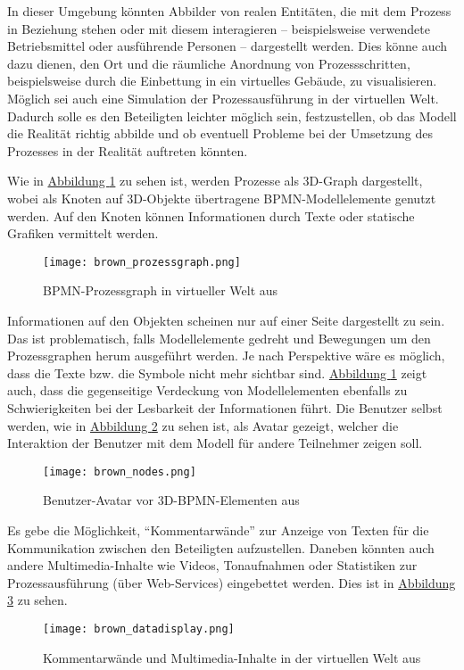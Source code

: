 \documentclass[a4paper,10pt]{sphinxmanual}
\begin{document}
In dieser Umgebung könnten Abbilder von realen Entitäten, die mit dem Prozess in Beziehung stehen oder mit diesem interagieren – beispielsweise verwendete Betriebsmittel oder ausführende Personen – dargestellt werden.
Dies könne auch dazu dienen, den Ort und die räumliche Anordnung von Prozessschritten, beispielsweise durch die Einbettung in ein virtuelles Gebäude, zu visualisieren.
Möglich sei auch eine Simulation der Prozessausführung in der virtuellen Welt.
Dadurch solle es den Beteiligten leichter möglich sein, festzustellen, ob das Modell die Realität richtig abbilde und ob eventuell Probleme bei der Umsetzung des Prozesses in der Realität auftreten könnten.

Wie in \hyperref[related:brown-process]{Abbildung  \ref*{related:brown-process}} zu sehen ist, werden Prozesse als 3D-Graph dargestellt, wobei als Knoten auf 3D-Objekte übertragene BPMN-Modellelemente genutzt werden.
Auf den Knoten können Informationen durch Texte oder statische Grafiken vermittelt werden.
\begin{figure}[htbp]
\centering
\capstart

\texttt{[image: brown\_prozessgraph.png]}
\caption{BPMN-Prozessgraph in virtueller Welt aus \cite{brown_conceptual_2010}}\label{related:brown-process}\end{figure}

Informationen auf den Objekten scheinen nur auf einer Seite dargestellt zu sein. Das ist problematisch, falls Modellelemente gedreht und Bewegungen um den Prozessgraphen herum ausgeführt werden.
Je nach Perspektive wäre es möglich, dass die Texte bzw. die Symbole nicht mehr sichtbar sind.
\hyperref[related:brown-process]{Abbildung  \ref*{related:brown-process}} zeigt auch, dass die gegenseitige Verdeckung von Modellelementen ebenfalls zu Schwierigkeiten bei der Lesbarkeit der Informationen führt.
Die Benutzer selbst werden, wie in \hyperref[related:brown-nodes]{Abbildung  \ref*{related:brown-nodes}} zu sehen ist, als Avatar gezeigt, welcher die Interaktion der Benutzer mit dem Modell für andere Teilnehmer zeigen soll.
\begin{figure}[htbp]
\centering
\capstart

\texttt{[image: brown\_nodes.png]}
\caption{Benutzer-Avatar vor 3D-BPMN-Elementen aus \cite{brown_conceptual_2010}}\label{related:brown-nodes}\end{figure}

Es gebe die Möglichkeit, "`Kommentarwände"' zur Anzeige von Texten für die Kommunikation zwischen den Beteiligten aufzustellen.
Daneben könnten auch andere Multimedia-Inhalte wie Videos, Tonaufnahmen oder Statistiken zur Prozessausführung (über Web-Services) eingebettet werden.
Dies ist in \hyperref[related:brown-datadisplay]{Abbildung  \ref*{related:brown-datadisplay}} zu sehen.
\begin{figure}[htbp]
\centering
\capstart

\texttt{[image: brown\_datadisplay.png]}
\caption{Kommentarwände und Multimedia-Inhalte in der virtuellen Welt aus \cite{brown_conceptual_2010}}\label{related:brown-datadisplay}\end{figure}
\end{document}
